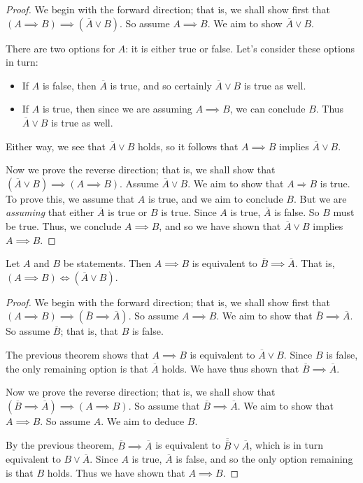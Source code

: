 \documentclass[11pt,dvipsnames]{book}
\numberwithin{figure}{section} %
\numberwithin{table}{section} %
\begin{document}
\begin{proof}
We begin with the forward direction;
that is, we shall show first that $(A \implies B) \implies (\overline{A} \vee B)$.
So assume $A\implies B$.
We aim to show $\overline{A} \vee B$.

There are two options for $A$: it is either true or false.
Let's consider these options in turn:
\begin{itemize}
\item If $A$ is false, then $\overline{A}$ is true, and so certainly $\overline{A} \vee B$ is true as well.
\item If $A$ is true, then since we are assuming $A\implies B$, we can conclude $B$.
Thus $\overline{A} \vee B$ is true as well.
\end{itemize}
Either way, we see that $\overline{A} \vee B$ holds, so it follows that $A\implies B$ implies $\overline{A} \vee B$.

Now we prove the reverse direction;
that is, we shall show that $(\overline{A} \vee B) \implies (A \implies B)$.
Assume $\overline{A} \vee B$.
We aim to show that $A\Rightarrow B$ is true.
To prove this, we assume that $A$ is true, and we aim to conclude $B$.
But we are \emph{assuming} that either $\overline{A}$ is true or $B$ is true.
Since $A$ is true, $\overline{A}$ is false.
So $B$ must be true.
Thus, we conclude $A\implies B$, and so we have shown that $\overline{A} \vee B$ implies $A \implies B$.
\end{proof}

\begin{theorem}
Let $A$ and $B$ be statements.
Then $A \implies B$ is equivalent to $\overline{B} \implies \overline{A}$.
That is, $(A \implies B) \iff (\overline{A} \vee B)$.
\end{theorem}

\begin{proof}
We begin with the forward direction;
that is, we shall show first that $(A \implies B) \implies (\overline{B} \implies \overline{A})$.
So assume $A\implies B$.
We aim to show that $\overline{B} \implies \overline{A}$.
So assume $\overline{B}$; that is, that $B$ is false.

The previous theorem shows that $A \implies B$ is equivalent to $\overline{A} \vee B$.
Since $B$ is false, the only remaining option is that $\overline{A}$ holds.
We have thus shown that $\overline{B} \implies \overline{A}$.

Now we prove the reverse direction;
that is, we shall show that $(\overline{B} \implies \overline{A}) \implies (A \implies B)$.
So assume that $\overline{B} \implies \overline{A}$.
We aim to show that $A \implies B$.
So assume $A$.
We aim to deduce $B$.

By the previous theorem, $\overline{B} \implies \overline{A}$ is equivalent to $\overline{\overline{B}} \vee \overline{A}$, which is in turn equivalent to $B \vee \overline{A}$.
Since $A$ is true, $\overline{A}$ is false, and so the only option remaining is that $B$ holds.
Thus we have shown that $A \implies B$.
\end{proof}
\end{document}
